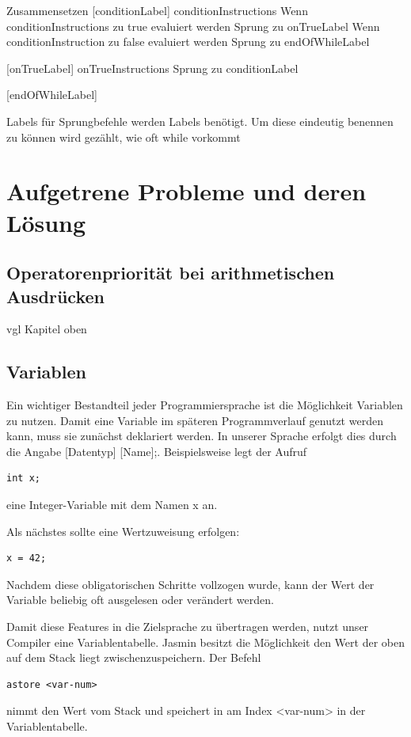 \documentclass[12pt, a4paper, oneside, ngerman]{article}
\begin{document}
Zusammensetzen
	[conditionLabel]
	conditionInstructions
		Wenn conditionInstructions zu true evaluiert werden
			Sprung zu onTrueLabel
		Wenn conditionInstruction zu false evaluiert werden
			Sprung zu endOfWhileLabel
	
	[onTrueLabel]
	onTrueInstructions
	Sprung zu conditionLabel	
			
	[endOfWhileLabel]

Labels
	für Sprungbefehle werden Labels benötigt. Um diese eindeutig benennen zu können wird gezählt, wie oft while vorkommt

\pagebreak


\section{Aufgetrene Probleme und deren Lösung}

\subsection{Operatorenpriorität bei arithmetischen Ausdrücken}
vgl Kapitel oben

\subsection{Variablen}
Ein wichtiger Bestandteil jeder Programmiersprache ist die Möglichkeit Variablen zu nutzen. Damit eine Variable im späteren Programmverlauf genutzt werden kann, muss sie zunächst deklariert werden. In unserer Sprache erfolgt dies durch die Angabe [Datentyp] [Name];. Beispielsweise legt der Aufruf

\begin{lstlisting}[frame=single]
int x;
\end{lstlisting}

eine Integer-Variable mit dem Namen x an.

Als nächstes sollte eine Wertzuweisung erfolgen:
\begin{lstlisting}[frame=single]
x = 42;
\end{lstlisting}

Nachdem diese obligatorischen Schritte vollzogen wurde, kann der Wert der Variable beliebig oft ausgelesen oder verändert werden.

Damit diese Features in die Zielsprache zu übertragen werden, nutzt unser Compiler eine Variablentabelle. Jasmin besitzt die Möglichkeit den Wert der oben auf dem Stack liegt zwischenzuspeichern. Der Befehl
\begin{lstlisting}[frame=single]
astore <var-num>
\end{lstlisting}
nimmt den Wert vom Stack und speichert in am Index <var-num> in der Variablentabelle.
\end{document}
